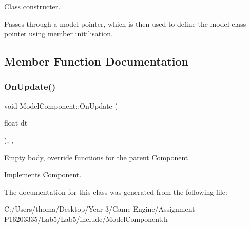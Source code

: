 Class constructer. 

Passes through a model pointer, which is then used to define the model class pointer using member initilisation. 

\subsection{Member Function Documentation}
\mbox{\label{class_model_component_a5def59776319943854fb5da3dc515051}} 
\subsubsection{\texorpdfstring{OnUpdate()}{OnUpdate()}}
{\footnotesize\ttfamily void Model\+Component\+::\+On\+Update (\begin{DoxyParamCaption}\item[{float}]{dt }\end{DoxyParamCaption})\hspace{0.3cm}{\ttfamily [inline]}, {\ttfamily [override]}, {\ttfamily [virtual]}}

Empty body, override functions for the parent \mbox{\hyperlink{class_component}{Component}} 

Implements \mbox{\hyperlink{class_component}{Component}}.



The documentation for this class was generated from the following file\+:\begin{DoxyCompactItemize}
\item 
C\+:/\+Users/thoma/\+Desktop/\+Year 3/\+Game Engine/\+Assignment-\/\+P16203335/\+Lab5/\+Lab5/include/Model\+Component.\+h\end{DoxyCompactItemize}
